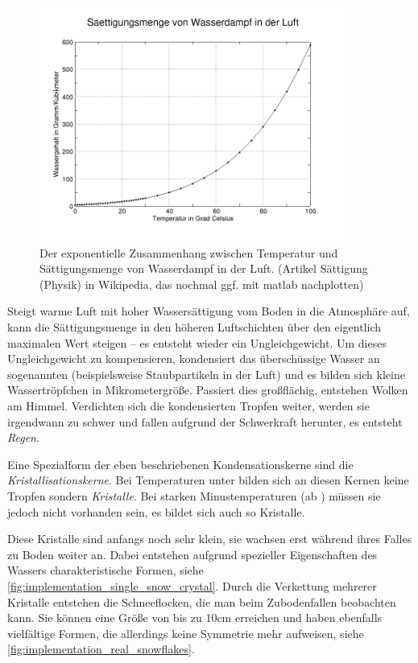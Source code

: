\begin{figure}[ht]
\centering
\includegraphics[width=10cm]{images/moist_air}
\caption{Der exponentielle Zusammenhang zwischen Temperatur und Sättigungsmenge von Wasserdampf in der Luft. (Artikel Sättigung (Physik) in Wikipedia, das nochmal ggf. mit matlab nachplotten)}
\label{fig:implementation_moist_air}
\end{figure}

Steigt warme Luft mit hoher Wassersättigung vom Boden in die
Atmosphäre auf, kann die Sättigungsmenge in den höheren Luftschichten
über den eigentlich maximalen Wert steigen -- es entsteht wieder ein
Ungleichgewicht. Um dieses Ungleichgewicht zu kompensieren, kondensiert
das überschüssige Wasser an sogenannten
 (beispielsweise Staubpartikeln in
der Luft) und es bilden sich kleine Wassertröpfchen in
Mikrometergröße. Passiert dies großflächig, entstehen Wolken am
Himmel. Verdichten sich die kondensierten Tropfen weiter, werden sie
irgendwann zu schwer und fallen aufgrund der Schwerkraft herunter, es
entsteht \emph{Regen}.

Eine Spezialform der eben beschriebenen Kondensationskerne sind die
\emph{Kristallisationskerne}. Bei Temperaturen unter 
bilden sich an diesen Kernen keine Tropfen sondern \emph{Kristalle}.
Bei starken Minustemperaturen (ab ) müssen sie
jedoch nicht vorhanden sein, es bildet sich auch so Kristalle.

Diese Kristalle sind anfangs noch sehr klein, sie wachsen erst während ihres
Falles zu Boden weiter an. Dabei entstehen aufgrund spezieller
Eigenschaften des Wassers charakteristische Formen, siehe
\autoref{fig:implementation_single_snow_crystal}. Durch die Verkettung
mehrerer Kristalle entstehen die Schneeflocken, die man beim
Zubodenfallen beobachten kann. Sie können eine Größe von bis zu 10cm
erreichen\cite{Nau96} und haben ebenfalls vielfältige Formen, die
allerdings keine Symmetrie mehr aufweisen, siehe
\autoref{fig:implementation_real_snowflakes}.

